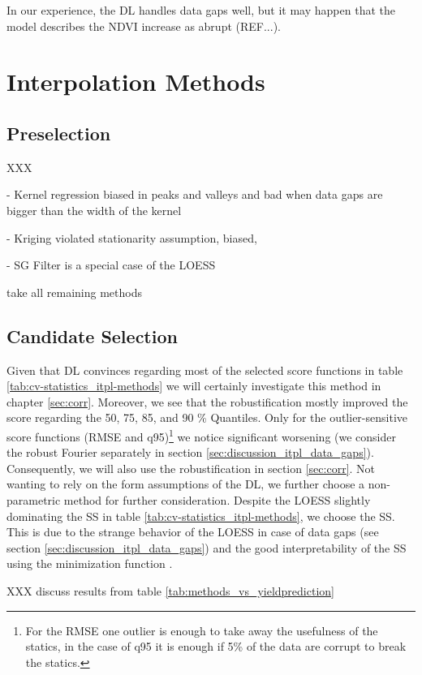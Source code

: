 In our experience, the DL handles data gaps well, but it may happen that the model describes the NDVI increase as abrupt (REF...).

\section{Interpolation Methods}{ \label{sec:discussion_itpl}
    \subsection{Preselection}{\label{sec:itpl_preselection}
        XXX

        - Kernel regression biased in peaks and valleys and bad when data gaps are bigger than the width of the kernel
        
        - Kriging violated stationarity assumption, biased, 

        - SG Filter is a special case of the LOESS

        take all remaining methods
    }

    \subsection{Candidate Selection}{
        Given that DL convinces regarding most of the selected score functions in table \ref{tab:cv-statistics_itpl-methods} we will certainly investigate this method in chapter \ref{sec:corr}. Moreover, we see that the robustification mostly improved the score regarding the 50, 75, 85, and 90 \% Quantiles. Only for the outlier-sensitive score functions (RMSE and q95)\footnote{For the RMSE one outlier is enough to take away the usefulness of the statics, in the case of q95 it is enough if 5\% of the data are corrupt to break the statics.} we notice significant worsening (we consider the robust Fourier separately in section \ref{sec:discussion_itpl_data_gaps}). Consequently, we will also use the robustification in section \ref{sec:corr}.
        Not wanting to rely on the form assumptions of the DL, we further choose a non-parametric method for further consideration. Despite the LOESS slightly dominating the SS in table \ref{tab:cv-statistics_itpl-methods}, we choose the SS. This is due to the strange behavior of the LOESS in case of data gaps (see section \ref{sec:discussion_itpl_data_gaps}) and the good interpretability of the SS using the minimization function .
    }


}

XXX discuss results from table \ref{tab:methods_vs_yieldprediction}

